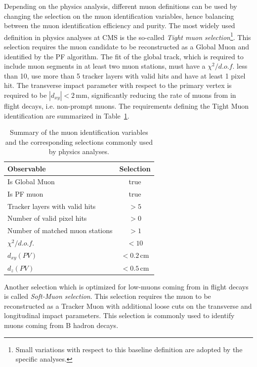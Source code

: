 Depending on the physics analysis, different muon definitions can be used by changing the selection on the muon identification variables, hence balancing between the muon identification efficiency and purity. The most widely used definition in physics analyses at CMS is the so-called \emph{Tight muon selection}\footnote{Small variations with respect to this baseline definition are adopted by the specific analyses.}. This selection requires the muon candidate to be reconstructed as a Global Muon and identified by the PF algorithm. The fit of the global track, which is required to include muon segments in at least two muon stations, must have a $\chi^2/d.o.f.$ less than 10, use more than 5 tracker layers with valid hits and have at least 1 pixel hit. The transverse impact parameter with respect to the primary vertex is required to be $|d_{xy}|<2$\,mm, significantly reducing the rate of muons from in flight decays, i.e. non-prompt muons. The requirements defining the Tight Muon identification are summarized in Table~\ref{tab:tightmuon}.

\begin{table}[htb]
\caption{Summary of the muon identification variables and the corresponding selections commonly used by physics analyses.}\label{tab:tightmuon}
\centering
\begin{tabular}{lc}
\toprule
Observable & Selection \\
\midrule
Is Global Muon & true \\
Is PF muon & true \\
Tracker layers with valid hits & $>5$ \\
Number of valid pixel hits & $>0$ \\
Number of matched muon stations & $>1$ \\
$\chi^2/d.o.f.$ & $<10$ \\
$d_{xy}(PV)$ & $< 0.2$\,cm \\
$d_{z}(PV)$ & $< 0.5$\,cm \\
\bottomrule
\end{tabular}
\end{table}

Another selection which is optimized for low-\pt muons coming from in flight decays is called \emph{Soft-Muon selection}. This selection requires the muon to be reconstructed as a Tracker Muon with additional loose cuts on the transverse and longitudinal impact parameters. This selection is commonly used to identify muons coming from B hadron decays.

